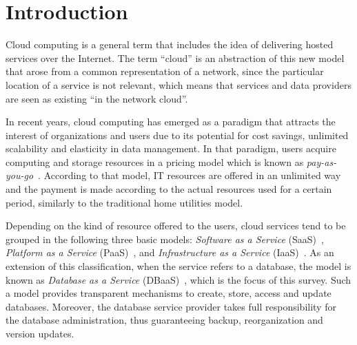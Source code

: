 \section{Introduction}
\label{intro}

Cloud computing is a general term that includes the idea of delivering hosted services over the Internet. The term ``cloud'' is an abstraction of this new model that arose from a common representation of a network, since the particular location of a service is not relevant, which means that services and data providers are seen as existing ``in the network cloud''.

In recent years, cloud computing has emerged as a paradigm that attracts the interest of organizations and users due to its potential for cost savings, unlimited scalability and elasticity in data management. In that paradigm, users acquire computing and storage resources in a pricing model which is known as \emph{pay-as-you-go}~\cite{Al-Roomi13}. According to that model, IT resources are offered in an unlimited way and the payment is made according to the actual resources used for a certain period, similarly to the traditional home utilities model.


Depending on the kind of resource offered to the users, cloud services tend to be grouped in the following three basic models: \emph{Software as a Service} (SaaS)~\cite{dubey2007delivering}, \emph{Platform as a Service} (PaaS)~\cite{beimborn2011platform}, and \emph{Infrastructure as a Service} (IaaS)~\cite{bhardwaj2010cloud}. As an exten\-sion of this classification, when the service refers to a database, the model is known as \emph{Database as a Service} (DBaaS)~\cite{curino2011relational}, which is the focus of this survey. Such a model provides transparent mechanisms to create, store, access and update databases. Moreover, the database service provider takes full responsibility for the database administration, thus guaranteeing backup, reorganization and version updates.

